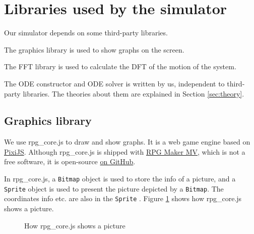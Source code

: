 \documentclass[12pt]{article}
\begin{document}
\section{Libraries used by the simulator}

Our simulator depends on some third-party libraries.

The graphics library is used to show graphs on the screen.

The FFT library is used to calculate the DFT of the motion of the system.

The ODE constructor and ODE solver is written by us,
independent to third-party libraries.
The theories about them are explained in Section \ref{sec:theory}.

\subsection{Graphics library}

We use rpg\_core.js to draw and show graphs.
It is a web game engine based on \href{https://www.pixijs.com}{PixiJS}.
Although rpg\_core.js is shipped with \href{https://tkool.jp/mv}{RPG Maker MV},
which is not a free software,
it is open-source \href{https://github.com/rpgtkoolmv/corescript}{on GitHub}.

In rpg\_core.js, a \texttt{Bitmap} object is used to store the info of a picture,
and a \texttt{Sprite} object is used to present the picture depicted by a \texttt{Bitmap}.
The coordinates info etc. are also in the \texttt{Sprite} \cite{rmmvhelp}.
Figure \ref{fig:show_picture} shows how rpg\_core.js shows a picture.

\begin{figure}[h]
  \centering
  \caption{How rpg\_core.js shows a picture}
  \label{fig:show_picture}
\end{figure}
\end{document}
